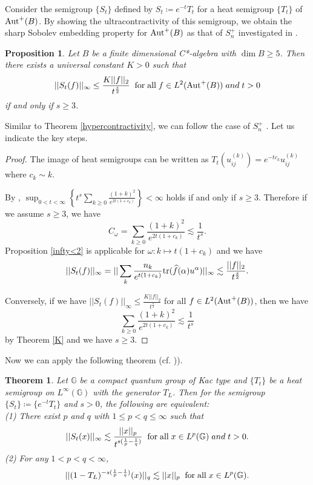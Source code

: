 \documentclass[12pt]{amsart}
\theoremstyle{plain} %
\newtheorem{theorem}[equation]{Theorem}
\newtheorem{proposition}[equation]{Proposition}
\theoremstyle{definition}
\theoremstyle{remark}
\begin{document}
Consider the semigroup $\{S_t\}$ defined by $S_t\coloneqq e^{-t}T_t$ for a heat semigroup $\{T_t\}$ of ${\rm Aut}^+(B)$.
By showing the ultracontractivity of this semigroup, we obtain the sharp Sobolev embedding property for ${\rm Aut}^+(B)$ as that of $S_n^+$ investigated in \cite{You20}.

\begin{proposition}\label{iff3}
Let $B$ be a finite dimensional C*-algebra with $\dim B\geq5$.
Then there exists a universal constant $K>0$ such that
\[||S_t(f)||_{\infty}\leq\frac{K||f||_2}{t^{\frac{s}{2}}}\;\;\text{for\;all}\;f\in L^2({\rm Aut}^+(B)) \;and\;t>0\]
if and only if $s\geq3$.
\end{proposition}

Similar to Theorem \ref{hypercontractivity}, we can follow the case of $S_n^+$ \cite[Cororally 6.2]{You20}. Let us indicate the key steps.

\begin{proof}
The image of heat semigroups can be written as $T_t(u_{ij}^{(k)})=e^{-tc_k}u_{ij}^{(k)}$ where $c_k\sim k$. 

By \cite[Lemma 6.1 (2)]{You20}, $\displaystyle \sup_{0<t<\infty}\left \{ t^s \sum_{k\geq 0}\frac{(1+k)^2}{e^{2t(1+c_k)}} \right\}<\infty$ holds if and only if $s\geq 3$.
Therefore if we assume $s\geq 3$, we have
\[C_{\omega}=\sum_{k\geq 0}\frac{(1+k)^2}{e^{2t(1+c_k)}}\lesssim \frac{1}{t^s}.\]
Proposition \ref{infty<2} is applicable for $\omega:k\mapsto t(1+c_k)$ and we have
\[||S_t(f)||_{\infty}= ||\sum_k \frac{n_k}{e^{t(1+c_k)}}{\rm tr} (\widehat{f}(\alpha)u^{\alpha})||_{\infty}\lesssim \frac{||f||_2}{t^{\frac{s}{2}}}.\]

Conversely, if we have $||S_t(f)||_{\infty}\leq\frac{K||f||_2}{t^{\frac{s}{2}}}$ for all $f\in L^2({\rm Aut}^+(B))$, then we have 
\[\sum_{k\geq 0}\frac{(1+k)^2}{e^{2t(1+c_k)}}\lesssim \frac{1}{t^s}\]
by Theorem \ref{K} and we have $s\geq3$.
\end{proof}

Now we can apply the following theorem \cite[Theorem 1.1]{Xio17} (cf. \cite[Theorem 3.1]{You20})).

\begin{theorem}\label{Xiong}
Let $\mathbb{G}$ be a compact quantum group of Kac type and $\{T_t\}$ be a heat semigroup on $L^{\infty}(\mathbb{G})$ with the generator $T_L$. Then for the semigroup $\{S_t\}\coloneqq \{e^{-t}T_t\}$ and $s>0$, the following are equivalent:\\
{\rm (1)} There exist $p$ and $q$ with $1\leq p<q\leq\infty$ such that
\[||S_t(x)||_{\infty}\lesssim \frac{||x||_p}{t^{s(\frac{1}{p}-\frac{1}{q})}}\;\;\text{for\;all}\;x\in L^p(\mathbb{G})\;and\;t>0.\]
{\rm (2)} For any $1<p<q<\infty$, 
\[||(1-T_L)^{-s(\frac{1}{p}-\frac{1}{q})}(x)||_q\lesssim||x||_p\;\;\text{for\;all}\;x\in L^p(\mathbb{G}).\]

\end{theorem}
\end{document}
